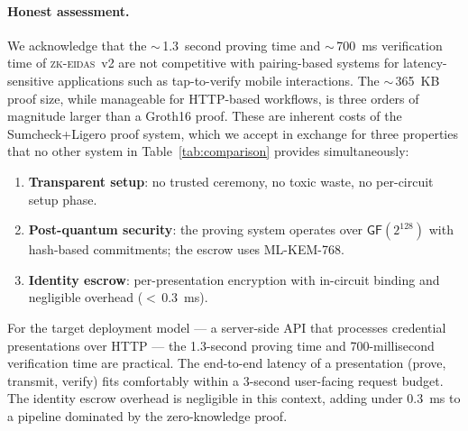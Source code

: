 \paragraph{Honest assessment.}
We acknowledge that the ${\sim}\,$1.3~second proving time and ${\sim}\,$700~ms verification time of \textsc{zk-eidas}~v2 are not competitive with pairing-based systems for latency-sensitive applications such as tap-to-verify mobile interactions.
The ${\sim}\,$365~KB proof size, while manageable for HTTP-based workflows, is three orders of magnitude larger than a Groth16 proof.
These are inherent costs of the Sumcheck+Ligero proof system, which we accept in exchange for three properties that no other system in Table~\ref{tab:comparison} provides simultaneously:
\begin{enumerate}
  \item \textbf{Transparent setup}: no trusted ceremony, no toxic waste, no per-circuit setup phase.
  \item \textbf{Post-quantum security}: the proving system operates over $\mathsf{GF}(2^{128})$ with hash-based commitments; the escrow uses ML-KEM-768.
  \item \textbf{Identity escrow}: per-presentation encryption with in-circuit binding and negligible overhead (${<}\,0.3$~ms).
\end{enumerate}
For the target deployment model --- a server-side API that processes credential presentations over HTTP --- the 1.3-second proving time and 700-millisecond verification time are practical.
The end-to-end latency of a presentation (prove, transmit, verify) fits comfortably within a 3-second user-facing request budget.
The identity escrow overhead is negligible in this context, adding under 0.3~ms to a pipeline dominated by the zero-knowledge proof.
